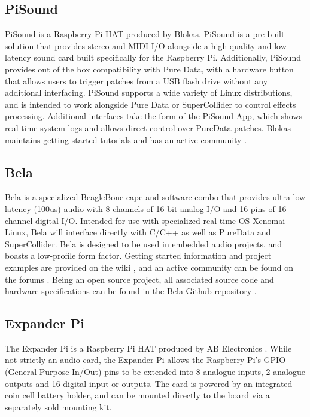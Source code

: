 \documentclass[journal,onecolumn,draftclsnofoot]{IEEEtran}
\begin{document}
\subsection{PiSound} %
PiSound is a Raspberry Pi HAT produced by Blokas. PiSound is a pre-built solution that provides stereo and MIDI I/O alongside a high-quality and low-latency sound card built specifically for the Raspberry Pi. Additionally, PiSound provides out of the box compatibility with Pure Data, with a hardware button that allows users to trigger patches from a USB flash drive without any additional interfacing. PiSound supports a wide variety of Linux distributions, and is intended to work alongside Pure Data or SuperCollider to control effects processing. Additional interfaces take the form of the PiSound App, which shows real-time system logs and allows direct control over PureData patches. Blokas maintains getting-started tutorials \cite{pisound:docs} and has an active community \cite{pisound:forum}. 
\subsection{Bela} %
Bela is a specialized BeagleBone cape and software combo that provides ultra-low latency (100us) audio with 8 channels of 16 bit analog I/O and 16 pins of 16 channel digital I/O. Intended for use with specialized real-time OS Xenomai Linux, Bela will interface directly with C/C++ as well as PureData and SuperCollider. Bela is designed to be used in embedded audio projects, and boasts a low-profile form factor. Getting started information and project examples are provided on the wiki \cite{bela:wiki}, and an active community can be found on the forums \cite{bela:forum}. Being an open source project, all associated source code and hardware specifications can be found in the Bela Github repository \cite{bela:repo}.
\subsection{Expander Pi} %
The Expander Pi is a Raspberry Pi HAT produced by AB Electronics \cite{expanderpi}. While not strictly an audio card, the Expander Pi allows the Raspberry Pi's GPIO (General Purpose In/Out) pins to be extended into 8 analogue inputs, 2 analogue outputs and 16 digital input or outputs. The card is powered by an integrated coin cell battery holder, and can be mounted directly to the board via a separately sold mounting kit.
\end{document}
